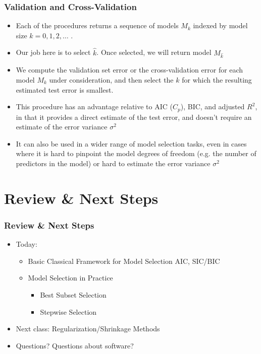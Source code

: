 \documentclass[
  shownotes,
  xcolor={svgnames},
  hyperref={colorlinks,citecolor=DarkBlue,linkcolor=DarkRed,urlcolor=DarkBlue}
  ]{beamer}
\begin{document}
\begin{frame}[fragile]
\frametitle{Validation and Cross-Validation}

\begin{itemize}
\item Each of the procedures returns a sequence of models $M_k$ indexed by model size $k = 0,1,2,\dots$ .
\item Our job here is to select $\hat k$. Once selected, we will return model $M_{\hat{k}}$
\item We compute the validation set error or the cross-validation error for each model $M_k$ under consideration, and then select the $k$ for which the resulting estimated test error is smallest.
\item This procedure has an advantage relative to AIC ($C_p$), BIC, and adjusted $R^2$, in that it provides a direct estimate of the test error, and doesn't require an estimate of the error variance $\sigma^2$
\item It can also be used in a wider range of model selection tasks, even in cases where it is hard to pinpoint the model degrees of freedom (e.g. the number of predictors in the model) or hard to estimate the error variance $\sigma^2$ 
\end{itemize}
\end{frame}


\section{Review \& Next Steps}
\begin{frame}
\frametitle{Review \& Next Steps}
  
\begin{itemize} 
    \item Today:
    \medskip
    \begin{itemize} 
      \item Basic Classical Framework for Model Selection AIC, SIC/BIC
      \medskip
      \item Model Selection in Practice  
        \begin{itemize}  
            \item Best Subset Selection
            \medskip
            \item Stepwise Selection
        \end{itemize}
    \end{itemize}
  	\bigskip  
	\item  Next class:  Regularization/Shrinkage Methods


\bigskip  
\item Questions? Questions about software? 

\end{itemize}
\end{frame}
\end{document}
